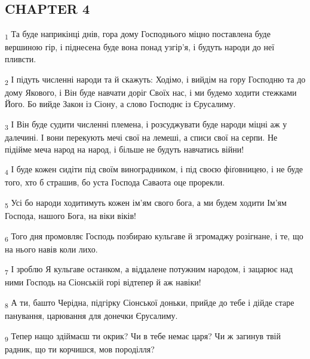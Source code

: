 \subsection{CHAPTER 4}
\begin{tcolorbox}
\textsubscript{1} Та буде наприкінці днів, гора дому Господнього міцно поставлена буде вершиною гір, і піднесена буде вона понад узгір'я, і будуть народи до неї пливсти.
\end{tcolorbox}
\begin{tcolorbox}
\textsubscript{2} І підуть численні народи та й скажуть: Ходімо, і вийдім на гору Господню та до дому Якового, і Він буде навчати доріг Своїх нас, і ми будемо ходити стежками Його. Бо вийде Закон із Сіону, а слово Господнє із Єрусалиму.
\end{tcolorbox}
\begin{tcolorbox}
\textsubscript{3} І Він буде судити численні племена, і розсуджувати буде народи міцні аж у далечині. І вони перекують мечі свої на лемеші, а списи свої на серпи. Не підійме меча народ на народ, і більше не будуть навчатись війни!
\end{tcolorbox}
\begin{tcolorbox}
\textsubscript{4} І буде кожен сидіти під своїм виноградником, і під своєю фіґовницею, і не буде того, хто б страшив, бо уста Господа Саваота оце прорекли.
\end{tcolorbox}
\begin{tcolorbox}
\textsubscript{5} Усі бо народи ходитимуть кожен ім'ям свого бога, а ми будем ходити Ім'ям Господа, нашого Бога, на віки віків!
\end{tcolorbox}
\begin{tcolorbox}
\textsubscript{6} Того дня промовляє Господь позбираю кульгаве й згромаджу розігнане, і те, що на нього навів коли лихо.
\end{tcolorbox}
\begin{tcolorbox}
\textsubscript{7} І зроблю Я кульгаве останком, а віддалене потужним народом, і зацарює над ними Господь на Сіонській горі відтепер й аж навіки!
\end{tcolorbox}
\begin{tcolorbox}
\textsubscript{8} А ти, башто Черідна, підгірку Сіонської доньки, прийде до тебе і дійде старе панування, царювання для донечки Єрусалиму.
\end{tcolorbox}
\begin{tcolorbox}
\textsubscript{9} Тепер нащо здіймаєш ти окрик? Чи в тебе немає царя? Чи ж загинув твій радник, що ти корчишся, мов породілля?
\end{tcolorbox}
